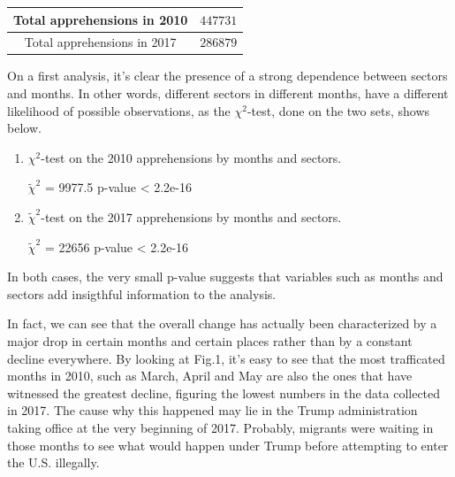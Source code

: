 \documentclass[journal, a4paper]{IEEEtran}
\begin{document}
	\begin{table}[!hbt]
		\begin{center}
	
			\label{tab:simParameters}
			
			
			
			\begin{tabular}{|c|c|}
				\hline
			Total apprehensions in 2010 & $447731$ \\
				\hline
			 Total apprehensions in 2017 & $286879$ \\
				\hline
			\end{tabular}
		\end{center}
	\end{table}
	
On a first analysis, it's clear the presence of a strong dependence between sectors and months. In other words, different sectors in different months, have a different likelihood of possible observations, as the $\chi^2$-test, done on the two sets, shows below.


\begin{enumerate}

\item $\chi^2$-test on the 2010 apprehensions by months and sectors.

\subitem $\tilde{\chi}^2$ = 9977.5      p-value < 2.2e-16


\item $\tilde{\chi}^2$-test on the 2017 apprehensions by months and sectors.

\subitem $\tilde{\chi}^2$ = 22656       p-value < 2.2e-16



\end{enumerate}

In both cases, the very small p-value suggests that variables such as months and sectors add insigthful information to the analysis.




In fact, we can see that the overall change has actually been characterized by a major drop in certain months and certain places rather than by a constant decline everywhere. By looking at Fig.1, it's easy to see that the most trafficated months in 2010, such as March, April and May are also the ones that have witnessed the greatest decline, figuring the lowest numbers in the data collected in 2017. The cause why this happened may lie in the Trump administration taking office at the very beginning of 2017. Probably, migrants were waiting in those months to see what would happen under Trump before attempting to enter the U.S. illegally.
\end{document}
